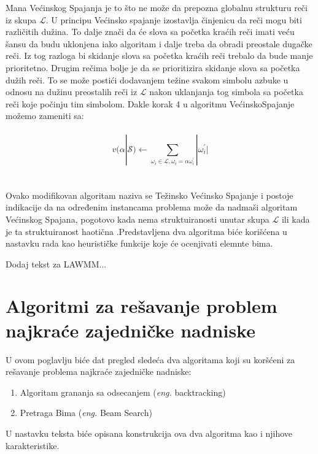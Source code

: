 \documentclass[12pt,oneside]{memoir}
\begin{document}
Mana Većinskog Spajanja je to što ne može da prepozna globalnu strukturu reči iz skupa $\mathcal{L}$.
U principu Većinsko spajanje izostavlja činjenicu da reči mogu biti različitih dužina. To dalje 
znači da će slova sa početka kraćih reči imati veću šansu da budu uklonjena iako algoritam i dalje treba
da obradi preostale dugačke reči. Iz tog razloga bi skidanje slova sa početka kraćih reči trebalo da bude
manje prioritetno. Drugim rečima bolje je da se prioritizira skidanje slova sa početka dužih reči.
To se može postići dodavanjem težine svakom simbolu azbuke u odnosu na dužinu preostalih reči iz $\mathcal{L}$ 
nakon uklanjanja tog simbola sa početka reči koje počinju tim simbolom. Dakle korak 4 u algoritmu VećinskoSpajanje
možemo zameniti sa:
\\
\\
\begin{equation}
  \label{eqn:wmm}
  v(\alpha|\mathcal{S}) \gets \sum_{\omega_{i}\in\mathcal{L},\omega_{i}=\alpha\omega^{'}_{i}}|\omega^{'}_{i}| 
\end{equation}
\\
\\
Ovako modifikovan algoritam naziva se Težinsko Većinsko Spajanje i postoje indikacije da na određenim instancama
problema može da nadmaši algoritam Većinskog Spajana, pogotovo kada nema struktuiranosti unutar skupa $\mathcal{L}$
ili kada je ta struktuiranost haotična \cite{ProbabilisticBS}.Predstavljena dva algoritma biće korišćena u nastavku
rada kao heurističke funkcije koje će ocenjivati elemnte bima.

Dodaj tekst za LAWMM...

\chapter{Algoritmi za rešavanje problem najkraće zajedničke nadniske}
U ovom poglavlju biće dat pregled sledeća dva algoritama koji su koršćeni za rešavanje problema najkraće zajedničke
nadniske:


\begin{enumerate}
  \item Algoritam grananja sa odsecanjem (\textit{eng.} backtracking)
  \item Pretraga Bima (\textit{eng.} Beam Search)
\end{enumerate}
U nastavku teksta biće opisana konstrukcija ova dva algoritma kao i njihove karakteristike.
\end{document}
